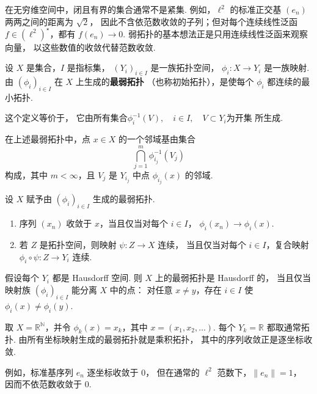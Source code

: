 



在无穷维空间中，闭且有界的集合通常不是紧集.
例如，$\ell^2$ 的标准正交基 $(e_n)$ 两两之间的距离为 $\sqrt{2}$，
因此不含依范数收敛的子列；但对每个连续线性泛函
$f\in(\ell^2)^\star$，都有 $f(e_n)\to0$.
弱拓扑的基本想法正是只用连续线性泛函来观察向量，
以这些数值的收敛代替范数收敛.

\begin{definition}[映射族生成的最弱拓扑]
    设 $X$ 是集合，$I$ 是指标集，
    $(Y_i)_{i\in I}$ 是一族拓扑空间，
    $\phi_i:X\to Y_i$ 是一族映射.
    由 $(\phi_i)_{i\in I}$ 在 $X$ 上生成的\textbf{最弱拓扑}
    （也称初始拓扑），是使每个 $\phi_i$ 都连续的最小拓扑.
    
\end{definition}


这个定义等价于，
它由所有集合$\phi_i^{-1}(V),\quad i\in I,\quad V\subset Y_i\text{为开集}$
所生成.

\begin{proposition}[邻域基]
    在上述最弱拓扑中，点 $x\in X$ 的一个邻域基由集合
    \[
        \bigcap_{j=1}^{m}\phi_{i_j}^{-1}(V_j)
    \]
    构成，其中 $m<\infty$，且 $V_j$ 是
    $Y_{i_j}$ 中点 $\phi_{i_j}(x)$ 的邻域.
\end{proposition}

\begin{proposition}[收敛与连续性的判别]
    设 $X$ 赋予由 $(\phi_i)_{i\in I}$ 生成的最弱拓扑.
    \begin{enumerate}
        \item 序列 $(x_n)$ 收敛于 $x$，当且仅当对每个 $i\in I$，
        $\phi_i(x_n)\to\phi_i(x)$.
        \item 若 $Z$ 是拓扑空间，则映射 $\psi:Z\to X$ 连续，
        当且仅当对每个 $i\in I$，复合映射
        $\phi_i\circ\psi:Z\to Y_i$ 连续.
    \end{enumerate}
\end{proposition}

\begin{proposition}[Hausdorff 性]
    假设每个 $Y_i$ 都是 Hausdorff 空间.
    则 $X$ 上的最弱拓扑是 Hausdorff 的，
    当且仅当映射族 $(\phi_i)_{i\in I}$ 能分离 $X$ 中的点：
    对任意 $x\ne y$，存在 $i\in I$ 使
    $\phi_i(x)\ne\phi_i(y)$.
\end{proposition}

\begin{example}[逐坐标收敛]
    取 $X=\mathbb{R}^{\mathbb{N}}$，并令
    $\phi_k(x)=x_k$，其中 $x=(x_1,x_2,\ldots)$.
    每个 $Y_k=\mathbb{R}$ 都取通常拓扑.
    由所有坐标映射生成的最弱拓扑就是乘积拓扑，
    其中的序列收敛正是逐坐标收敛.

    例如，标准基序列 $e_n$ 逐坐标收敛于 $0$，
    但在通常的 $\ell^2$ 范数下，$\|e_n\|=1$，
    因而不依范数收敛于 $0$.
\end{example}

